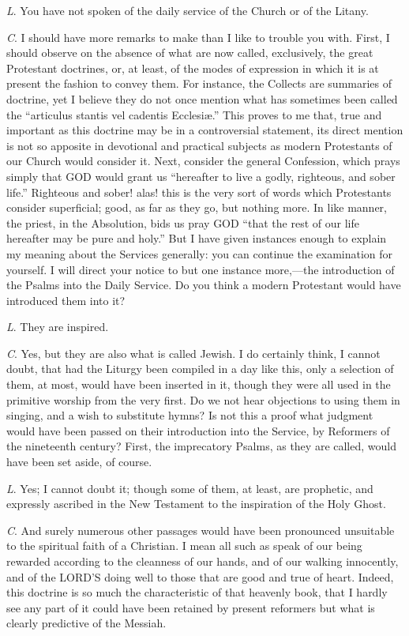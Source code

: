 \emph{L}. You have not spoken of the daily
service of the Church or of the Litany.

\emph{C}. I should have more remarks to make than
I like to trouble you with. First, I should observe on the absence
of what are now called, exclusively, the great Protestant
doctrines, or, at least, of the modes of expression in which it is at
present the fashion to convey them. For instance, the Collects are
summaries of doctrine, yet I believe they do not once mention what has
sometimes been called the ``articulus stantis vel cadentis Ecclesiæ.''
This proves to me that, true and important as this doctrine may be in
a controversial statement, its direct mention is not so apposite in
devotional and practical subjects as modern Protestants of our Church
would consider it. Next, consider the general Confession, which prays
simply that GOD would grant us ``hereafter
to live a godly, righteous, and sober life.'' Righteous and sober!
alas! this is the very sort of words which Protestants consider
superficial; good, as far as they go, but nothing more. In like
manner, the priest, in the Absolution, bids us pray GOD
``that the rest of our life hereafter may be pure and holy.'' But I have
given instances enough to explain my meaning about the Services
generally: you can continue the examination for yourself. I will
direct your notice to but one instance more,—the introduction of the
Psalms into the Daily Service. Do you think a modern Protestant would
have introduced them into it?

\emph{L}. They are inspired.

\emph{C}. Yes, but they are also what is called
Jewish. I do certainly think, I cannot doubt, that had the Liturgy
been compiled in a day like this, only a selection of them, at most,
would have been inserted in it, though they were all used in the
primitive worship from the very first. Do we not hear objections to
using them in singing, and a wish to substitute hymns? Is not this a
proof what judgment would have been passed on their introduction into
the Service, by Reformers of the nineteenth century? First, the
imprecatory Psalms, as they are called, would have been set aside, of
course.

\emph{L}. Yes; I cannot doubt it; though some of
them, at least, are prophetic, and expressly ascribed in the New
Testament to the inspiration of the Holy Ghost.

\emph{C}. And surely numerous other passages
would have been pronounced unsuitable to the spiritual faith of a
Christian. I mean all such as speak of our being rewarded according to
the cleanness of our hands, and of our walking innocently, and of the
LORD'S doing well to those that
are good and true of heart. Indeed, this doctrine is so much the
characteristic of that heavenly book, that I hardly see any part of it
could have been retained by present reformers but what is clearly
predictive of the Messiah.

